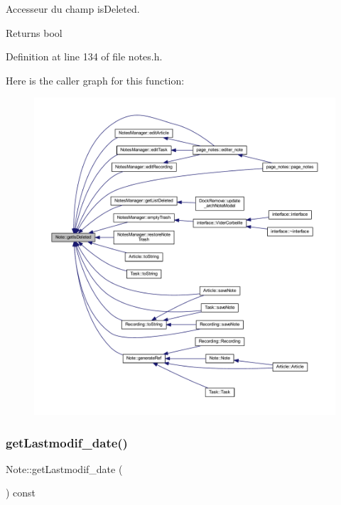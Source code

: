Accesseur du champ is\+Deleted. 

\begin{DoxyReturn}{Returns}
bool 
\end{DoxyReturn}


Definition at line 134 of file notes.\+h.

Here is the caller graph for this function\+:\nopagebreak
\begin{figure}[H]
\begin{center}
\leavevmode
\includegraphics[width=350pt]{class_note_af56c546c7e0e471b2dd5b201d4835e37_icgraph}
\end{center}
\end{figure}
\mbox{\label{class_note_ab1811bb7017d2e1487c90f39b946d572}} 
\subsubsection{\texorpdfstring{get\+Lastmodif\+\_\+date()}{getLastmodif\_date()}}
{\footnotesize\ttfamily Note\+::get\+Lastmodif\+\_\+date (\begin{DoxyParamCaption}{ }\end{DoxyParamCaption}) const\hspace{0.3cm}{\ttfamily [inline]}}



